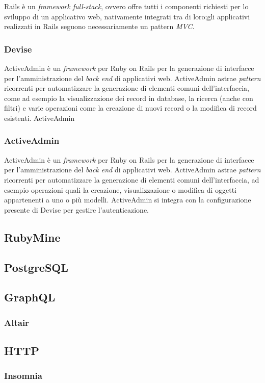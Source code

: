 Rails è un \textit{framework full-stack}, ovvero offre tutti i componenti richiesti per lo sviluppo di un applicativo web, nativamente integrati tra di loro;gli applicativi realizzati in Rails seguono necessariamente un pattern \textit{MVC}.

\subsubsection{Devise}
ActiveAdmin è un \textit{framework} per Ruby on Rails per la generazione di interfacce per l'amministrazione del \textit{back end} di applicativi web. ActiveAdmin astrae \textit{pattern} ricorrenti per automatizzare la generazione di elementi comuni dell'interfaccia, come ad esempio la visualizzazione dei record in database, la ricerca (anche con filtri) e varie operazioni come la creazione di nuovi record o la modifica di record esistenti. ActiveAdmin 

\subsubsection{ActiveAdmin}
ActiveAdmin è un \textit{framework} per Ruby on Rails per la generazione di interfacce per l'amministrazione del \textit{back end} di applicativi web. ActiveAdmin astrae \textit{pattern} ricorrenti per automatizzare la generazione di elementi comuni dell'interfaccia, ad esempio operazioni quali la creazione, visualizzazione o modifica di oggetti appartenenti a uno o più modelli. ActiveAdmin si integra con la configurazione presente di Devise per gestire l'autenticazione.
\subsection{RubyMine}
\subsection{PostgreSQL}
\subsection{GraphQL}
\subsubsection{Altair}
\subsection{HTTP}
\subsubsection{Insomnia}

